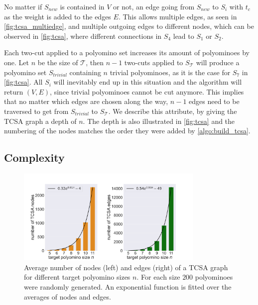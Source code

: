 No matter if $S_\textit{new}$ is contained in $V$ or not, an edge going from $S_\textit{new}$ to $S_i$ with $t_c$ as the weight is added to the edges $E$.
This allows multiple edges, as seen in \autoref{fig:tcsa_multiedge}, and multiple outgoing edges to different nodes, which can be observed in \autoref{fig:tcsa}, where different connections in $S_4$ lead to $S_1$ or $S_2$.

Each two-cut applied to a polyomino set increases its amount of polyominoes by one.
Let $n$ be the size of $\mathcal{T}$, then $n-1$ two-cuts applied to $S_\mathcal{T}$ will produce a polyomino set $S_\textit{trivial}$ containing $n$ trivial polyominoes, as it is the case for $S_7$ in \autoref{fig:tcsa}.
All $S_i$ will inevitably end up in this situation and the algorithm will return $(V,E)$, since trivial polyominoes cannot be cut anymore.
This implies that no matter which edges are chosen along the way, $n-1$ edges need to be traversed to get from $S_\textit{trivial}$ to $S_\mathcal{T}$.
We describe this attribute, by giving the TCSA graph a depth of $n$.
The depth is also illustrated in \autoref{fig:tcsa} and the numbering of the nodes matches the order they were added by \autoref{algo:build_tcsa}.

\subsection{Complexity}

\begin{figure}
	\centering
	\includegraphics[width=0.8\textwidth]{figures/plots/tcsa_nodes_edges.pdf}
	\caption[Average two-cut-sub-assembly nodes and edges for target size $n$.]{Average number of nodes (left) and edges (right) of a TCSA graph for different target polyomino sizes $n$. For each size $200$ polyominoes were randomly generated. An exponential function is fitted over the averages of nodes and edges.}
	\label{fig:tcsa_plot}
\end{figure}

